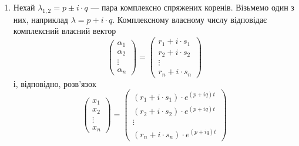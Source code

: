 \begin{enumerate}
\item Нехай $\lambda_{1,2} = p \pm i \cdot q$ --- пара комплексно спряжених коренів. Візьмемо один з них, наприклад $\lambda = p + i \cdot q$. Комплексному власному числу відповідає комплексний власний вектор
\begin{equation*}
	\begin{pmatrix} \alpha_1 \\ \alpha_2 \\ \vdots \\ \alpha_n \end{pmatrix} =
	\begin{pmatrix} r_1 + i \cdot s_1 \\ r_2 + i \cdot s_2 \\ \vdots \\ r_n + i \cdot s_n \end{pmatrix}
\end{equation*}
і, відповідно, розв'язок
\begin{equation*}
	\begin{pmatrix} x_1 \\ x_2 \\ \vdots \\ x_n \end{pmatrix} =
	\begin{pmatrix} (r_1 + i \cdot s_1) \cdot e^{(p + i q) t} \\ (r_2 + i \cdot s_2) \cdot e^{(p + i q) t} \\ \vdots \\ (r_n + i \cdot s_n) \cdot e^{(p + i q) t} \end{pmatrix}
\end{equation*}


\end{enumerate}
